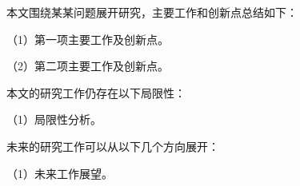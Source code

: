 
\conclusion

本文围绕某某问题展开研究，主要工作和创新点总结如下：

（1）第一项主要工作及创新点。

（2）第二项主要工作及创新点。

本文的研究工作仍存在以下局限性：

（1）局限性分析。

未来的研究工作可以从以下几个方向展开：

（1）未来工作展望。

